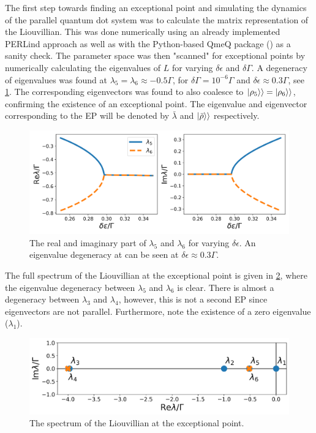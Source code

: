 \documentclass[../main.tex]{subfiles}
\begin{document}
The first step towards finding an exceptional point and simulating the dynamics of the parallel quantum dot system was to calculate the matrix representation of the Liouvillian. This was done numerically using an already implemented PERLind approach as well as with the Python-based QmeQ package (\cite{qmeq}) as a sanity check. The parameter space was then "scanned" for exceptional points by numerically calculating the eigenvalues of $L$ for varying $\delta\epsilon$ and $\delta\Gamma$. A degeneracy of eigenvalues was found at $\lambda_5 = \lambda_6\approx -0.5\Gamma$, for $\delta\Gamma = 10^{-6}\Gamma$ and $\delta\epsilon \approx 0.3\Gamma$, see \cref{fig:tuning}. The corresponding eigenvectors was found to also coalesce to $\ket{\rho_5}\rangle = \ket{\rho_6}\rangle$, confirming the existence of an exceptional point. The eigenvalue and eigenvector corresponding to the EP will be denoted by $\bar \lambda$ and $\ket{\bar\rho}\rangle$ respectively.
\begin{figure}[H]
    \centering
    \includegraphics[width=0.9\linewidth]{figures/tuning.png}
    \caption{The real and imaginary part of $\lambda_5$ and $\lambda_6$ for varying $\delta\epsilon$. An eigenvalue degeneracy at can be seen at $\delta\epsilon\approx0.3\Gamma$.}
    \label{fig:tuning}
\end{figure}

The full spectrum of the Liouvillian at the exceptional point is given in \cref{fig:spec}, where the eigenvalue degeneracy between $\lambda_5$ and $\lambda_6$ is clear. There is almost a degeneracy between $\lambda_3$ and $\lambda_4$, however, this is not a second EP since eigenvectors are not parallel. Furthermore, note the existence of a zero eigenvalue ($\lambda_1$).

\begin{figure}[H]
    \centering
    \includegraphics[width=0.8\linewidth]{figures/spectrum.png}
    \caption{The spectrum of the Liouvillian at the exceptional point.}
    \label{fig:spec}
\end{figure}
\end{document}
